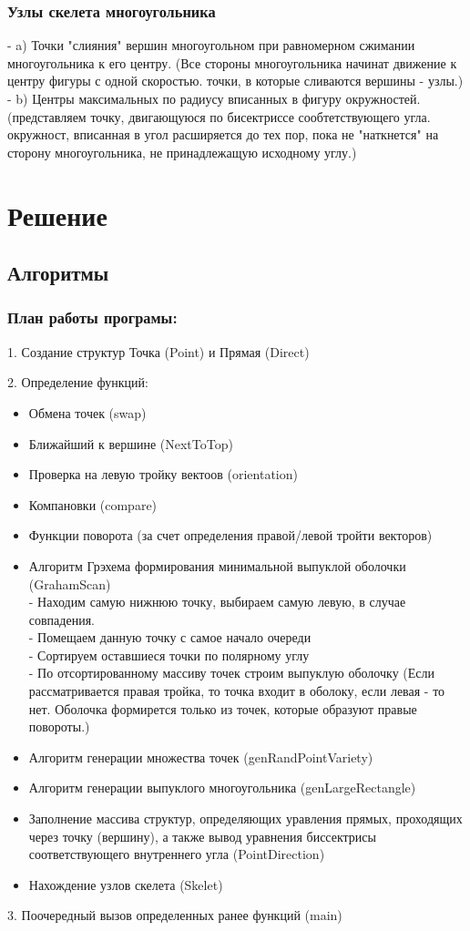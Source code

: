 \documentclass[a4paper,11pt]{article}
\begin{document}
\subsection {Узлы скелета многоугольника }
- a) Точки "слияния" вершин многоугольном при равномерном сжимании многоугольника к его центру. (Все стороны многоугольника начинат движение к центру фигуры с одной скоростью. точки, в которые сливаются вершины - узлы.)
\\- b) Центры максимальных по радиусу вписанных в фигуру окружностей. (представляем точку, двигающуюся по бисектриссе сообтетствующего угла. окружност, вписанная в угол расширяется до тех пор, пока не "наткнется" на сторону многоугольника, не принадлежащую исходному углу.)


\chapter {Решение}
\section {Алгоритмы}
\subsection {План работы програмы:}

1. Создание структур Точка (Point) и Прямая (Direct)

2. Определение функций:

\begin{itemize}
\item Обмена точек (swap)
\item Ближайший к вершине (NextToTop)
\item Проверка на левую тройку вектоов (orientation)
\item Компановки (compare)
\item Функции поворота (за счет определения правой/левой тройти векторов)
\item Алгоритм Грэхема формирования минимальной выпуклой оболочки (GrahamScan)
\\ - Находим самую нижнюю точку, выбираем самую левую, в случае совпадения.
\\ - Помещаем данную точку с самое начало очереди
\\ - Сортируем оставшиеся точки по полярному углу 
\\ - По отсортированному массиву точек строим выпуклую оболочку (Если рассматривается правая тройка, то точка входит в оболоку, если левая - то нет. Оболочка формирется только из точек, которые образуют правые повороты.)
\item Алгоритм генерации множества точек (genRandPointVariety)
\item Алгоритм генерации выпуклого многоугольника (genLargeRectangle)
\item Заполнение массива структур, определяющих уравления прямых, проходящих через точку (вершину), а также вывод уравнения биссектрисы соответствующего внутреннего угла (PointDirection)
\item Нахождение узлов скелета (Skelet)
\end{itemize}
3. Поочередный вызов определенных ранее функций (main)
\end{document}
